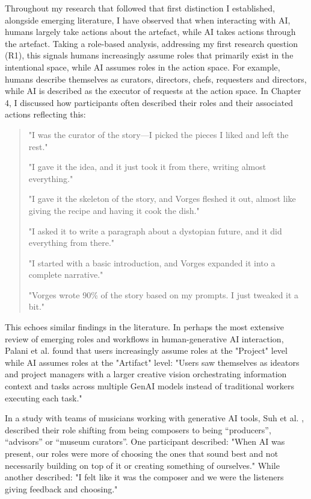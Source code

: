 Throughout my research that followed that first distinction I established, alongside emerging literature, I have observed that when interacting with AI, humans largely take actions about the artefact, while AI takes actions through the artefact. Taking a role-based analysis, addressing my first research question (R1), this signals humans increasingly assume roles that primarily exist in the intentional space, while AI assumes roles in the action space. For example, humans describe themselves as curators, directors, chefs, requesters and directors, while AI is described as the executor of requests at the action space. In Chapter 4, I discussed how participants often described their roles and their associated actions reflecting this:

\begin{quote}
"I was the curator of the story—I picked the pieces I liked and left the rest."

"I gave it the idea, and it just took it from there, writing almost everything."

"I gave it the skeleton of the story, and Vorges fleshed it out, almost like giving the recipe and having it cook the dish."

"I asked it to write a paragraph about a dystopian future, and it did everything from there."

"I started with a basic introduction, and Vorges expanded it into a complete narrative."

"Vorges wrote 90\% of the story based on my prompts. I just tweaked it a bit."
\end{quote}

This echoes similar findings in the literature. In perhaps the most extensive review of emerging roles and workflows in human-generative AI interaction, Palani et al. \cite{Palani2024-on} found that users increasingly assume roles at the "Project" level while AI assumes roles at the "Artifact" level: "Users saw themselves as ideators and project managers with a larger creative vision orchestrating information context and tasks across multiple GenAI models instead of traditional workers executing each task."

In a study with teams of musicians working with generative AI tools, Suh et al. \cite{Suh2021-cj}, described their role shifting from being composers to being “producers”, “advisors” or “museum curators”. One participant described: "When AI was present, our roles were more of choosing the ones that sound best and not necessarily building on top of it or creating something of ourselves." While another described: "I felt like it was the composer and we were the listeners giving feedback and choosing."

